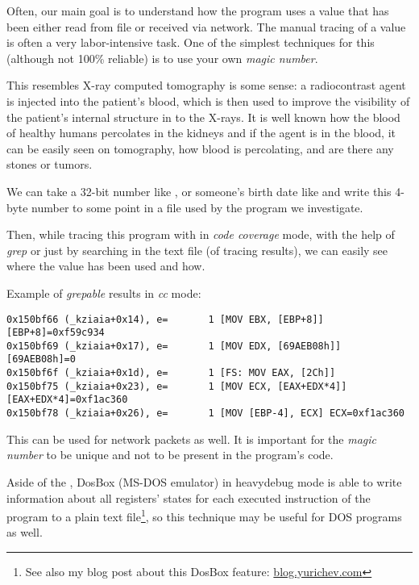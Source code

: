 
Often, our main goal is to understand how the program uses a value that has been either read from file or received via network. 
The manual tracing of a value is often a very labor-intensive task. One of the simplest techniques for this (although not 100\% reliable) 
is to use your own \emph{magic number}.

This resembles X-ray computed tomography is some sense: a radiocontrast agent is injected into the patient's blood,
which is then used to improve the visibility of the patient's internal structure in to the X-rays.
It is well known how the blood of healthy humans
percolates in the kidneys and if the agent is in the blood, it can be easily seen on tomography, how blood is percolating,
and are there any stones or tumors.

We can take a 32-bit number like , or someone's birth date like 
and write this 4-byte number to some point in a file used by the program we investigate.

\myindex{\GrepUsage}

Then, while tracing this program with \tracer in \emph{code coverage} mode, with the help of \emph{grep}
or just by searching in the text file (of tracing results), we can easily see where the value has been used and how.

Example 
of \emph{grepable} \tracer results in \emph{cc} mode:

\begin{lstlisting}[style=customasmx86]
0x150bf66 (_kziaia+0x14), e=       1 [MOV EBX, [EBP+8]] [EBP+8]=0xf59c934 
0x150bf69 (_kziaia+0x17), e=       1 [MOV EDX, [69AEB08h]] [69AEB08h]=0 
0x150bf6f (_kziaia+0x1d), e=       1 [FS: MOV EAX, [2Ch]] 
0x150bf75 (_kziaia+0x23), e=       1 [MOV ECX, [EAX+EDX*4]] [EAX+EDX*4]=0xf1ac360 
0x150bf78 (_kziaia+0x26), e=       1 [MOV [EBP-4], ECX] ECX=0xf1ac360 
\end{lstlisting}

This can be used for network packets as well.
It is important for the \emph{magic number} to be unique and not to be present in the program's code.

\newcommand{\DOSBOXURL}{\href{http://blog.yurichev.com/node/55}{blog.yurichev.com}}

Aside of 
the \tracer, DosBox (MS-DOS emulator) in heavydebug mode
is able to write information about all registers' states for each executed instruction of the program to a plain text file\footnote{See also my 
blog post about this DosBox feature: \DOSBOXURL{}}, so this technique may be useful for DOS programs as well.

